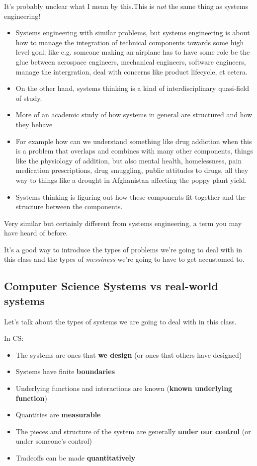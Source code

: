 \documentclass[11pt]{article}
\begin{document}
It's probably unclear what I mean by this.This is {\it not} the same thing as systems engineering! 

\begin{itemize}
    \item Systems engineering with similar problems, but systems engineering is about how to manage the integration of technical components towards some high level goal, like e.g. someone making an airplane has to have some role be the glue between aerospace engineers, mechanical engineers, software engineers, manage the intergration, deal with concerns like product lifecycle, et cetera. 
    \item On the other hand, systems thinking is a kind of interdisciplinary quasi-field of study.
    \item More of an academic study of how systems in general are structured and how they behave
    \item For example how can we understand something like drug addiction when this is a problem that overlaps and combines with many other components, things like the physiology of addition, but also mental health, homelessness, pain medication prescriptions, drug smuggling, public attitudes to drugs, all they way to things like a drought in Afghanistan affecting the poppy plant yield.
    \item Systems thinking is figuring out how these components fit together and the structure between the components.
\end{itemize}

Very similar but certainly different from systems engineering, a term you may have heard of before. 

It's a good way to introduce the types of problems we're going to deal with in this class and the types of {\it messiness} we're going to have to get accustomed to. 

\subsection{Computer Science Systems vs real-world systems}

Let's talk about the types of systems we are going to deal with in this class.

In CS:
\begin{itemize}
    \item The systems are ones that {\bf we design} (or ones that others have designed)
    \item Systems have finite {\bf boundaries}
    \item Underlying functions and interactions are known ({\bf known underlying function})
    \item Quantities are {\bf measurable}
    \item The pieces and structure of the system are generally {\bf under our control} (or under someone's control)
    \item Tradeoffs can be made {\bf quantitatively}
\end{itemize}
\end{document}
